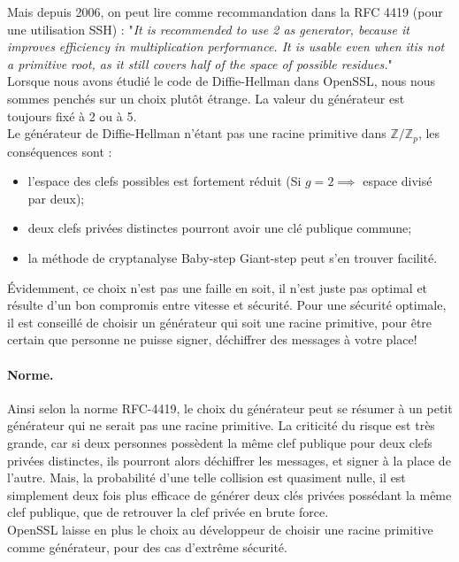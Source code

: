 		Mais depuis 2006, on peut lire comme recommandation dans la RFC 4419 (pour une utilisation SSH) : "\textit{It is recommended to use 2 as generator, because it improves	efficiency in multiplication performance.  It is usable even when itis not a primitive root, as it still covers half of the space of possible residues.}"\\
	
		Lorsque nous avons étudié le code de Diffie-Hellman dans OpenSSL, nous nous sommes penchés sur un choix plutôt étrange. La valeur du générateur est toujours fixé à 2 ou à 5. \\
	
		Le générateur de Diffie-Hellman n'étant pas une racine primitive dans $\mathbb{Z}/\mathbb{Z}_p$, les conséquences sont :
		\begin{itemize}
		\item l'espace des clefs possibles est fortement réduit (Si $g=2 \implies$ espace divisé par deux);
		\item deux clefs privées distinctes pourront avoir une clé publique commune;
		\item la méthode de cryptanalyse Baby-step Giant-step peut s'en trouver 
		facilité.\\
		\end{itemize}
	
		Évidemment, ce choix n'est pas une faille en soit, il n'est juste pas optimal et résulte d'un bon compromis entre vitesse et sécurité. Pour une sécurité optimale, il est conseillé de choisir un générateur qui soit une racine primitive, pour être certain que personne ne puisse signer, déchiffrer des messages à votre place!\\
		
\paragraph{Norme.\\}
Ainsi selon la norme RFC-4419, le choix du générateur peut se résumer à un petit générateur qui ne serait pas une racine primitive. La criticité du risque est très grande, car si deux personnes possèdent la même clef publique pour deux clefs privées distinctes, ils pourront alors déchiffrer les messages, et signer à la place de l'autre. Mais, la probabilité d'une telle collision est quasiment nulle, il est simplement deux fois plus efficace de générer deux clés privées possédant la même clef publique, que de retrouver la clef privée en brute force.\\
OpenSSL laisse en plus le choix au développeur de choisir une racine primitive comme générateur, pour des cas d'extrême sécurité.

